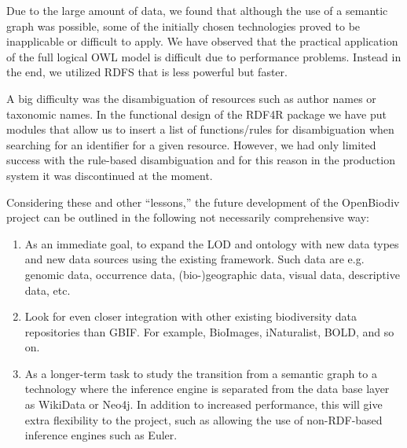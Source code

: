 Due to the large amount of data, we found that although the use of a semantic graph was possible, some of the initially chosen technologies proved to be inapplicable or difficult to apply. We have observed that the practical application of the full logical OWL model is difficult due to performance problems. Instead in the end, we utilized RDFS that is less powerful but faster.

A big difficulty was the disambiguation of resources such as author names or taxonomic names. In the functional design of the RDF4R package we have put modules that allow us to insert a list of functions/rules for disambiguation when searching for an identifier for a given resource. However, we had only limited success with the rule-based disambiguation and for this reason in the production system it was discontinued at the moment.

Considering these and other ``lessons,'' the future development of the OpenBiodiv project can be outlined in the following not necessarily comprehensive way:

\begin{enumerate}
    \item As an immediate goal, to expand the LOD and ontology with new data types and new data sources using the existing framework. Such data are e.g. genomic data, occurrence data, (bio-)geographic data, visual data, descriptive data, etc.
    \item Look for even closer integration with other existing biodiversity data repositories than GBIF. For example, BioImages, iNaturalist, BOLD, and so on.
    \item As a longer-term task to study the transition from a semantic graph to a technology where the inference engine is separated from the data base layer as WikiData or Neo4j. In addition to increased performance, this will give extra flexibility to the project, such as allowing the use of non-RDF-based inference engines such as Euler.
\end{enumerate}



